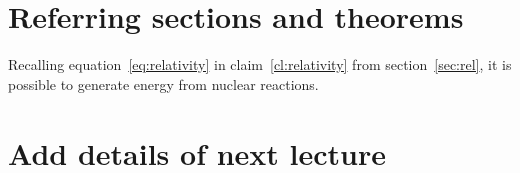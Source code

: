 \section{Referring sections and theorems}
Recalling equation~\ref{eq:relativity} in claim~\ref{cl:relativity} from section~\ref{sec:rel},
it is possible to generate energy from nuclear reactions.





\section{Add details of next lecture}
